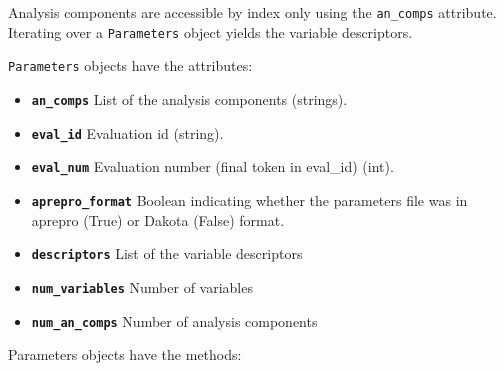 Analysis components are accessible by index only using the {\tt an\_comps} attribute. Iterating over a {\tt Parameters} 
object yields the variable descriptors.

{\tt Parameters} objects have the attributes:

\begin{itemize}

  \item{} \label{index:dakota.interfacing.Parameters.an_comps}\textbf{\texttt{an\_comps}} List of the analysis components (strings).

  \item{} \label{index:dakota.interfacing.Parameters.eval_id}\textbf{\texttt{eval\_id}} Evaluation id (string).

  \item{} \label{index:dakota.interfacing.Parameters.eval_num}\textbf{\texttt{eval\_num}} Evaluation number (final token in eval\_id) (int).


  \item{} \label{index:dakota.interfacing.Parameters.aprepro_format}\textbf{\texttt{aprepro\_format}} Boolean indicating whether the parameters file was in aprepro (True) or Dakota (False) format.

  \item{}\label{index:dakota.interfacing.Parameters.descriptors}\textbf{\texttt{descriptors}} List of the variable descriptors

  \item{} \label{index:dakota.interfacing.Parameters.num_variables}\textbf{\texttt{num\_variables}} Number of variables

  \item{}\label{index:dakota.interfacing.Parameters.num_an_comps}\textbf{\texttt{num\_an\_comps}} Number of analysis components

\end{itemize}

Parameters objects have the methods:

